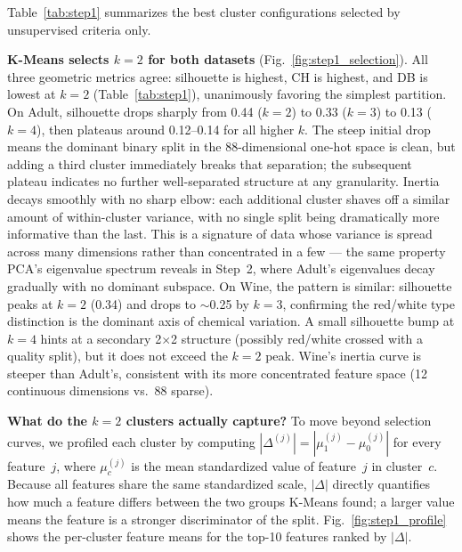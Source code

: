 \documentclass[conference]{IEEEtran}
\begin{document}
Table~\ref{tab:step1} summarizes the best cluster configurations
selected by unsupervised criteria only.

\textbf{K-Means selects $k{=}2$ for both datasets}
(Fig.~\ref{fig:step1_selection}). All three geometric metrics agree:
silhouette is highest, CH is highest, and DB is lowest at $k{=}2$
(Table~\ref{tab:step1}), unanimously favoring the simplest partition.
On Adult, silhouette drops sharply
from 0.44 ($k{=}2$) to 0.33 ($k{=}3$) to 0.13 ($k{=}4$), then
plateaus around 0.12--0.14 for all higher $k$. The steep initial drop
means the dominant binary split in the 88-dimensional one-hot space is
clean, but adding a third cluster immediately breaks that separation;
the subsequent plateau indicates no further well-separated structure
at any granularity. Inertia decays smoothly with no sharp elbow: each
additional cluster shaves off a similar amount of within-cluster
variance, with no single split being dramatically more informative
than the last. This is a signature of data whose variance is spread
across many dimensions rather than concentrated in a few --- the same
property PCA's eigenvalue spectrum reveals in Step~2, where Adult's
eigenvalues decay gradually with no dominant subspace. On Wine, the pattern is similar: silhouette peaks at
$k{=}2$ (0.34) and drops to $\sim$0.25 by $k{=}3$, confirming the
red/white type distinction is the dominant axis of chemical variation.
A small silhouette bump at $k{=}4$ hints at a secondary 2$\times$2
structure (possibly red/white crossed with a quality split), but it
does not exceed the $k{=}2$ peak. Wine's inertia curve is steeper
than Adult's, consistent with its more concentrated feature space (12
continuous dimensions vs.\ 88 sparse).

\textbf{What do the $k{=}2$ clusters actually capture?} To move
beyond selection curves, we profiled each cluster by computing
$|\Delta^{(j)}| = |\mu_1^{(j)} - \mu_0^{(j)}|$ for every feature~$j$,
where $\mu_c^{(j)}$ is the mean standardized value of feature~$j$ in
cluster~$c$. Because all features share the same standardized scale,
$|\Delta|$ directly quantifies how much a feature differs between the
two groups K-Means found; a larger value means the feature is a
stronger discriminator of the split.
Fig.~\ref{fig:step1_profile} shows the per-cluster feature means for
the top-10 features ranked by $|\Delta|$.
\end{document}
